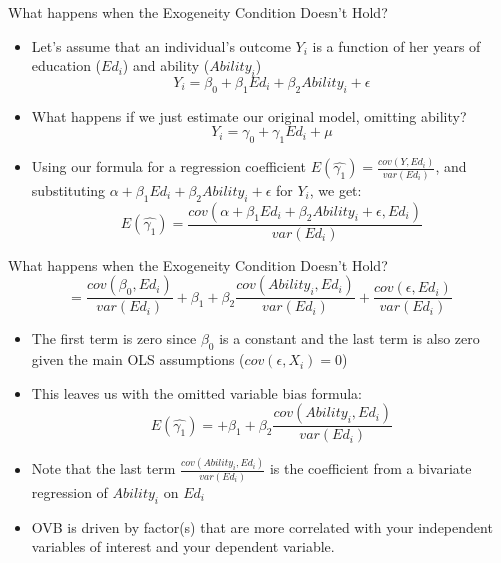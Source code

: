 \documentclass{beamer}
\begin{document}
\begin{frame}{What happens when the Exogeneity Condition Doesn't Hold?}
	\begin{itemize}
		\item Let's assume that an individual's outcome $Y_{i}$ is a function of her years of education ($Ed_i$) and ability ($Ability_i$)
      		  \begin{equation}
        			Y_{i}=\beta_0+\beta_{1}Ed_{i} +\beta_{2}Ability_{i} +\epsilon
       		 \end{equation}
		     \pause
		 \item What happens if we just estimate our original model, omitting ability?
      		  \begin{equation}
        			Y_{i}=\gamma_0+\gamma_{1}Ed_{i} +\mu
       		 \end{equation}		
		     \pause
		\item Using our formula for a regression coefficient  $E(\hat{\gamma_1})=\frac{cov(Y,Ed_i)}{var(Ed_i)}$, and substituting $\alpha+\beta_{1}Ed_{i} +\beta_{2}Ability_{i} +\epsilon$ for $Y_i$, we get:
		 \begin{equation}
        			E(\hat{\gamma_1})=\frac{cov(\alpha+\beta_{1}Ed_{i} +\beta_{2}Ability_{i} +\epsilon,Ed_i)}{var(Ed_i)}
       		 \end{equation}	

	\end{itemize}

\end{frame}

\begin{frame}{What happens when the Exogeneity Condition Doesn't Hold?}
	\begin{equation}
        		=\frac{cov(\beta_0,Ed_i)}{var(Ed_i)}+\beta_1 +\beta_{2}\frac{cov(Ability_i,Ed_i)}{var(Ed_i)}+\frac{cov(\epsilon, Ed_i)}{var(Ed_i)}
       	\end{equation}	

	\begin{itemize}
		\item The first term is zero since $\beta_0$ is a constant and the last term is also zero given the main OLS assumptions ($cov(\epsilon, X_i)=0$)
		\pause
		\item This leaves us with the omitted variable bias formula:
	\begin{equation}
        		E(\hat{\gamma_1})=+\beta_1 +\beta_{2}\frac{cov(Ability_i,Ed_i)}{var(Ed_i)}
       	\end{equation}	
	\pause	
	\item Note that the last term $\frac{cov(Ability_i,Ed_i)}{var(Ed_i)}$ is the coefficient from a bivariate regression of $Ability_i$ on $Ed_i$
	\item OVB is driven by factor(s) that are more correlated with your independent variables of interest and your dependent variable. 
	\end{itemize}

\end{frame}
\end{document}
